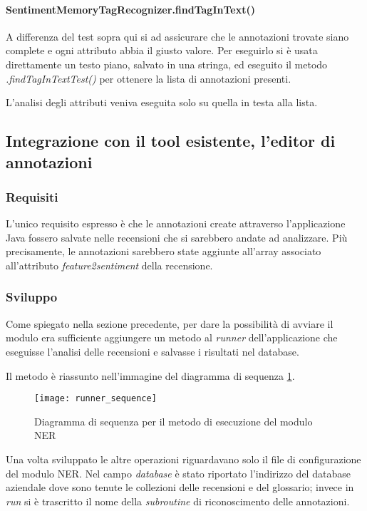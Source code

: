 \paragraph{SentimentMemoryTagRecognizer.findTagInText()}
A differenza del test sopra qui si ad assicurare che le annotazioni trovate
siano complete e ogni attributo abbia il giusto valore. Per eseguirlo si è
usata direttamente un testo piano, salvato in una stringa, ed eseguito il metodo
\textit{.findTagInTextTest()} per ottenere la lista di annotazioni presenti.

L'analisi degli attributi veniva eseguita solo su quella in testa alla lista.

\subsection{Integrazione con il tool esistente, l'editor di annotazioni}
\subsubsection{Requisiti}
L'unico requisito espresso è che le annotazioni create attraverso l'applicazione
Java fossero salvate nelle recensioni che si sarebbero andate ad analizzare.
Più precisamente, le annotazioni sarebbero state aggiunte all'array associato
all'attributo \textit{feature2sentiment} della recensione.

\subsubsection{Sviluppo}
Come spiegato nella sezione precedente, per dare la possibilità di avviare il
modulo era sufficiente aggiungere un metodo al \textit{runner} dell'applicazione
che eseguisse l'analisi delle recensioni e salvasse i risultati nel database.

Il metodo è riassunto nell'immagine del diagramma di sequenza
\ref{fig:runner_sequence}.

\begin{figure}[t]
\begin{center}
\texttt{[image: runner\_sequence]}
\caption{
Diagramma di sequenza per il metodo di esecuzione del modulo NER
}
\label{fig:runner_sequence}
\end{center}
\end{figure}

Una volta sviluppato le altre operazioni riguardavano solo il file di
configurazione del modulo \gls{NER}. Nel campo \textit{database} è stato
riportato l'indirizzo del database aziendale dove sono tenute le collezioni
delle recensioni e del glossario; invece in \textit{run} si è trascritto il nome
della \textit{subroutine} di riconoscimento delle annotazioni.

